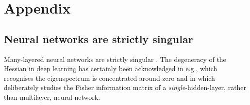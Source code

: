 \documentclass[11pt]{article}
\numberwithin{equation}{section}
\theoremstyle{plain}
\theoremstyle{definition}
\begin{document}


%






\appendix
\section{Appendix}

\subsection{Neural networks are strictly singular}
\label{appendix:nn_singular}
Many-layered neural networks are strictly singular \citep[\S 7.2]{watanabe_algebraic_2009}. The degeneracy of the Hessian in deep learning has certainly been acknowledged in e.g., \citet{DBLP:journals/corr/SagunBL16} which recognises the eigenspectrum is concentrated around zero and in \citet{pennington_spectrum_2018} which deliberately studies the Fisher information matrix of a \textit{single}-hidden-layer, rather than multilayer, neural network. 
\end{document}
